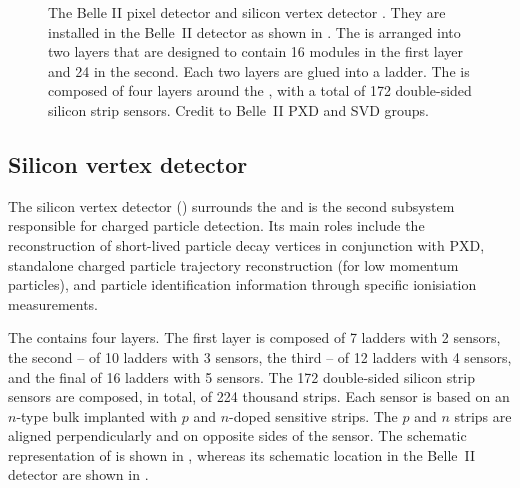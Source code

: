 \begin{figure}[htbp!]
    \centering
    \caption{\label{fig:pxd_svd} 
    The Belle II pixel detector  and silicon vertex detector .
    They are installed in the Belle~II detector as shown in .
    The \PXD is arranged into two layers that are designed to contain 16 modules in the first layer and 24 in the second.
    Each two layers are glued into a ladder.
    The \SVD is composed of four layers around the \PXD, with a total of 172 double-sided silicon strip sensors.
    Credit to Belle~II PXD and SVD groups.}
\end{figure}

\subsection{Silicon vertex detector}\label{sec:svd}

The silicon vertex detector (\SVD) \cite{Belle-IISVD:2023mxk} surrounds the \PXD and 
is the second subsystem responsible for charged particle detection.
Its main roles include the reconstruction of short-lived particle decay vertices in conjunction with PXD,
standalone charged particle trajectory reconstruction (for low momentum particles),
and particle identification information through specific ionisiation measurements.

The \SVD contains four layers. 
The first layer is composed of 7 ladders with 2 sensors,
the second -- of 10 ladders with 3 sensors,
the third -- of 12 ladders with 4 sensors,
and the final of 16 ladders with 5 sensors.
The 172 double-sided silicon strip sensors are composed, in total, of 224 thousand strips.
Each sensor is based on an $n$-type bulk implanted with $p$ and $n$-doped sensitive strips.
The $p$ and $n$ strips are aligned perpendicularly and on opposite sides of the sensor.
The schematic representation of \SVD is shown in , whereas its schematic location in the Belle~II detector are shown in .

